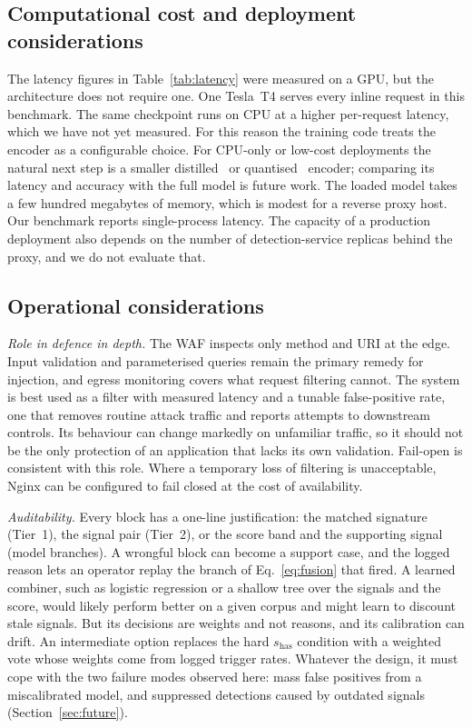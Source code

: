\documentclass[preprint,11pt]{elsarticle}
\begin{document}
\subsection{Computational cost and deployment considerations}
The latency figures in Table~\ref{tab:latency} were measured on a GPU, but
the architecture does not require one. One Tesla~T4 serves every inline
request in this benchmark. The same checkpoint runs on CPU at a higher
per-request latency, which we have not yet measured. For this reason the
training code treats the encoder as a configurable choice. For CPU-only or
low-cost deployments the natural next step is a smaller
distilled~\cite{sanh2019distilbert} or
quantised~\cite{jacob2018quantization} encoder; comparing its latency and
accuracy with the full model is future work. The loaded model takes a few
hundred megabytes of memory, which is modest for a reverse proxy host. Our
benchmark reports single-process latency. The capacity of a production
deployment also depends on the number of detection-service replicas behind
the proxy, and we do not evaluate that.

\subsection{Operational considerations}
\emph{Role in defence in depth.} The WAF inspects only method and URI at
the edge. Input validation and parameterised queries remain the primary
remedy for injection, and egress monitoring covers what request filtering
cannot. The system is best used as a filter with measured latency and a
tunable false-positive rate, one that removes routine attack traffic and
reports attempts to downstream controls. Its behaviour can change markedly
on unfamiliar traffic, so it should not be the only protection of an
application that lacks its own validation. Fail-open is consistent with
this role. Where a temporary loss of filtering is unacceptable, Nginx can
be configured to fail closed at the cost of availability.

\emph{Auditability.} Every block has a one-line justification: the matched
signature (Tier~1), the signal pair (Tier~2), or the score band and the
supporting signal (model branches). A wrongful block can become a support
case, and the logged reason lets an operator replay the branch of
Eq.~\eqref{eq:fusion} that fired. A learned combiner, such as logistic
regression or a shallow tree over the signals and the score, would likely
perform better on a given corpus and might learn to discount stale signals.
But its decisions are weights and not reasons, and its calibration can
drift. An intermediate option replaces the hard $s_{\text{has}}$ condition
with a weighted vote whose weights come from logged trigger rates. Whatever
the design, it must cope with the two failure modes observed here: mass
false positives from a miscalibrated model, and suppressed detections
caused by outdated signals (Section~\ref{sec:future}).
\end{document}
